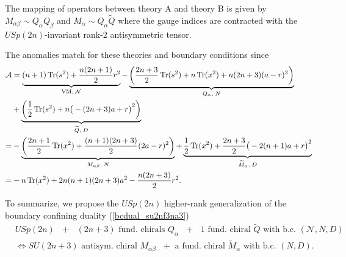 \documentclass[12pt]{article}
\newcommand{\Acal}{\mathcal{A}}
\newcommand{\Ncal}{\mathcal{N}}
\DeclareMathOperator*{\Tr}{{\rm Tr}}
\numberwithin{equation}{section}
\begin{document}
The mapping of operators between theory A and theory B is given by
$M_{\alpha \beta} \sim Q_{\alpha} Q_{\beta}$ and $M_{\alpha} \sim Q_{\alpha} \widetilde{Q}$ where the gauge indices are contracted with the $USp(2n)$-invariant rank-$2$ antisymmetric tensor.

The anomalies match for these theories and boundary conditions since
\begin{align}
\label{bdy_USp2n_2np4_anom}
\Acal & = \underbrace{(n+1)\Tr(s^2) + \frac{n(2n+1)}{2}r^2}_{\textrm{VM}, \; \Ncal}
 - \underbrace{\left( \frac{2n+3}{2}\Tr(s^2) + n\Tr(x^2) + n(2n+3)(a-r)^2 \right)}_{Q_{\alpha}, \; N}
  \nonumber \\
 & + \underbrace{\left( \frac{1}{2}\Tr(s^2) + n\big( -(2n+3) a + r \big)^2 \right)}_{\widetilde{Q}, \; D}
   \nonumber \\
  = & - \underbrace{\left( \frac{2n+1}{2} \Tr(x^2) + \frac{(n+1)(2n+3)}{2}(2a-r)^2 \right)}_{M_{\alpha \beta}, \; N}
   + \underbrace{\frac{1}{2} \Tr(x^2) + \frac{2n+3}{2}\big( -2(n+1)a+r \big)^2}_{\widetilde{M}_{\alpha}, \; D}
  \nonumber \\
  = & - n \Tr(x^2) + 2n(n+1)(2n+3)a^2 - \frac{n(2n+3)}{2}r^2.
\end{align}

To summarize, we propose the $USp(2n)$ higher-rank generalization of the boundary confining duality (\ref{bcdual_su2nf3na3})
\begin{align}
\label{bdy_USp2n_2np4_dual}
&\textrm{$USp(2n)$ $+$ $(2n+3)$ fund. chirals $Q_{\alpha}$ $+$ $1$ fund. chiral $\widetilde{Q}$ with b.c. $(\mathcal{N},N,D)$}
\nonumber\\
&\Leftrightarrow 
\textrm{
$SU(2n+3)$ antisym. chiral $M_{\alpha \beta}$ $+$ a fund. chiral $\widetilde{M}_{\alpha}$ with b.c. $(N,D)$}. 
\end{align}
\end{document}
